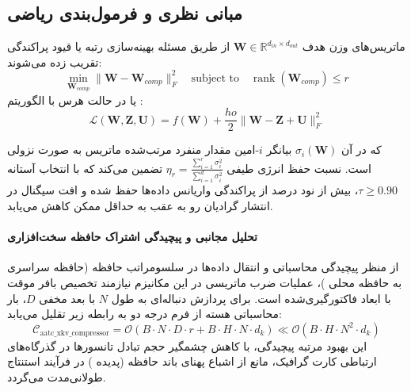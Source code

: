 \subsection{مبانی نظری و فرمول‌بندی ریاضی}
ماتریس‌های وزن هدف $\mathbf{W} \in \mathbb{R}^{d_{in} \times d_{out}}$ از طریق مسئله بهینه‌سازی رتبه یا قیود پراکندگی تقریب زده می‌شوند:
 \begin{equation}
\min_{\mathbf{W}_{comp}} \|\mathbf{W} - \mathbf{W}_{comp}\|_F^2 \quad \text{subject to} \quad \operatorname{rank}(\mathbf{W}_{comp}) \le r
\end{equation}
یا در حالت هرس با الگوریتم :
 \begin{equation}
\mathcal{L}(\mathbf{W}, \mathbf{Z}, \mathbf{U}) = f(\mathbf{W}) +\frac{
ho}{2} \|\mathbf{W} - \mathbf{Z} + \mathbf{U}\|_F^2
\end{equation}

که در آن $\sigma_i(\mathbf{W})$ بیانگر $i$-امین مقدار منفرد مرتب‌شده ماتریس به صورت نزولی است. نسبت حفظ انرژی طیفی $\eta_r = \frac{\sum_{i=1}^r \sigma_i^2}{\sum_{i=1}^{d} \sigma_i^2}$ تضمین می‌کند که با انتخاب آستانه $\tau \ge 0.90$، بیش از نود درصد از پراکندگی واریانس داده‌ها حفظ شده و افت سیگنال در انتشار گرادیان رو به عقب به حداقل ممکن کاهش می‌یابد.

\paragraph{تحلیل مجانبی و پیچیدگی اشتراک حافظه سخت‌افزاری}
از منظر پیچیدگی محاسباتی و انتقال داده‌ها در سلسومراتب حافظه (حافظه سراسری  به حافظه محلی )، عملیات ضرب ماتریسی در این مکانیزم نیازمند تخصیص بافر موقت با ابعاد فاکتورگیری‌شده است. برای پردازش دنباله‌ای به طول $N$ با بعد مخفی $D$، بار محاسباتی هسته از فرم درجه دو به رابطه زیر تقلیل می‌یابد:
\begin{equation}
\label{eq:complexity_aatc_xkv_compressor}
\mathcal{C}_{\text{aatc\_xkv\_compressor}} = \mathcal{O}\left( B \cdot N \cdot D \cdot r + B \cdot H \cdot N \cdot d_k \right) \ll \mathcal{O}\left( B \cdot H \cdot N^2 \cdot d_k \right)
\end{equation}
این بهبود مرتبه پیچیدگی، با کاهش چشمگیر حجم تبادل تانسورها در گذرگاه‌های ارتباطی کارت گرافیک، مانع از اشباع پهنای باند حافظه (پدیده ) در فرآیند استنتاج طولانی‌مدت می‌گردد.
